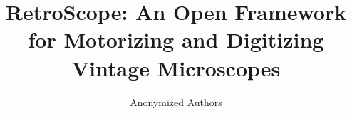 \documentclass[runningheads]{llncs}
\begin{document}
%
\title{RetroScope: An Open Framework for Motorizing and Digitizing Vintage Microscopes}


%

\author{Anonymized Authors}  %
  
\end{document}
